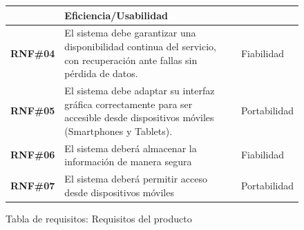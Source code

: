 \begin{figure}[H]
\begin{tabularx}{\textwidth}{|l|X|l|}
        & 
        
            Eficiencia/Usabilidad 
        
    \\ \hline
    
            \textbf{RNF\#04} 
        
        & 
        
            El sistema debe garantizar una disponibilidad continua del servicio, con recuperación ante fallas sin pérdida de datos. 
        
        & 
        
            Fiabilidad 
        
    \\ \hline
    
            \textbf{RNF\#05} 
        
        & 
        
            El sistema debe adaptar su interfaz gráfica correctamente para ser accesible desde dispositivos móviles (Smartphones y Tablets). 
        
        & 
        
            Portabilidad 
        
    \\ \hline
    
            \textbf{RNF\#06} 
        
        & 
        
            El sistema deberá almacenar la información de manera segura 
        
        & 
        
            Fiabilidad 
        
    \\ \hline
    
            \textbf{RNF\#07} 
        
        & 
        
            El sistema deberá permitir acceso desde dispositivos móviles 
        
        & 
        
            Portabilidad 
        
    \\ \hline
    \end{tabularx}
    \caption{Tabla de requisitos: Requisitos del producto}
\end{figure}
